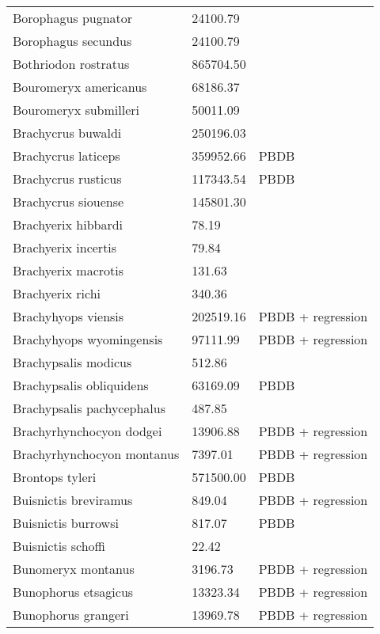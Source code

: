 \documentclass{article}
\begin{document}
\begin{center}
\begin{longtable}{p{} p{} p{}}
    Borophagus pugnator & 24100.79 & \cite{Tomiya2013} \\ 
    Borophagus secundus & 24100.79 & \cite{Tomiya2013} \\ 
    Bothriodon rostratus & 865704.50 & \cite{Cassiliano2008} \\ 
    Bouromeryx americanus & 68186.37 & \cite{Tomiya2013} \\ 
    Bouromeryx submilleri & 50011.09 & \cite{Tomiya2013} \\ 
    Brachycrus buwaldi & 250196.03 & \cite{Tomiya2013} \\ 
    Brachycrus laticeps & 359952.66 & PBDB \\ 
    Brachycrus rusticus & 117343.54 & PBDB \\ 
    Brachycrus siouense & 145801.30 & \cite{Tomiya2013} \\ 
    Brachyerix hibbardi & 78.19 & \cite{Clemens2011} \\ 
    Brachyerix incertis & 79.84 & \cite{Tomiya2013} \\ 
    Brachyerix macrotis & 131.63 & \cite{Tomiya2013} \\ 
    Brachyerix richi & 340.36 & \cite{Tomiya2013} \\ 
    Brachyhyops viensis & 202519.16 & PBDB + regression \\ 
    Brachyhyops wyomingensis & 97111.99 & PBDB + regression \\ 
    Brachypsalis modicus & 512.86 & \cite{Tomiya2013} \\ 
    Brachypsalis obliquidens & 63169.09 & PBDB \\ 
    Brachypsalis pachycephalus & 487.85 & \cite{Tomiya2013} \\ 
    Brachyrhynchocyon dodgei & 13906.88 & PBDB + regression \\ 
    Brachyrhynchocyon montanus & 7397.01 & PBDB + regression \\ 
    Brontops tyleri & 571500.00 & PBDB \\ 
    Buisnictis breviramus & 849.04 & PBDB + regression \\ 
    Buisnictis burrowsi & 817.07 & PBDB \\ 
    Buisnictis schoffi & 22.42 & \cite{Tomiya2013} \\ 
    Bunomeryx montanus & 3196.73 & PBDB + regression \\ 
    Bunophorus etsagicus & 13323.34 & PBDB + regression \\ 
    Bunophorus grangeri & 13969.78 & PBDB + regression \\ 

\end{longtable}
\end{center}
\end{document}
